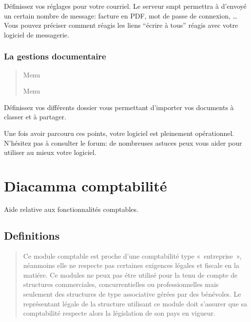 \documentclass[a4paper,10pt,oneside,french]{sphinxmanual}
\begin{document}
Définissez vos réglages pour votre courriel.
Le serveur smpt permettra à  d’envoyé un certain nombre de message: facture en PDF, mot de passe de connexion, …
Vous pouvez préciser comment réagis les liens “écrire à tous” réagis avec votre logiciel de messagerie.


\subsection{La gestions documentaire}
\label{\detokenize{pro/first_step:la-gestions-documentaire}}\begin{quote}

Menu 

Menu 
\end{quote}

Définissez vos différents dossier vous permettant d’importer vos documents à classer et à partager.

Une fois avoir parcouru ces points, votre logiciel  est pleinement opérationnel.
N’hésitez pas à consulter le forum: de nombreuses astuces peux vous aider pour utiliser au mieux votre logiciel.


\chapter{Diacamma comptabilité}
\label{\detokenize{accounting/index:diacamma-comptabilite}}\label{\detokenize{accounting/index::doc}}
Aide relative aux fonctionnalités comptables.


\section{Definitions}
\label{\detokenize{accounting/definition:definitions}}\label{\detokenize{accounting/definition::doc}}\begin{quote}

 Ce module comptable est proche d’une comptabilité type « entreprise », néanmoins elle ne respecte pas certaines exigences légales et fiscale en la matiére.
Ce modules ne peux pas étre utilisé pour la tenu de compte de structures commerciales, concurrentielles ou professionnelles mais seulement des structures de type associative gérées par des bénévoles.
Le représentant légale de la structure utilisant ce module doit s’assurer que sa comptabilité respecte alors la législation de son pays en vigueur.
\end{quote}
\end{document}
